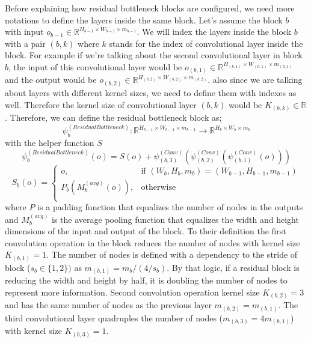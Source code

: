 Before explaining how residual bottleneck blocks are configured, we need more notations to define the layers inside the same block. Let's assume the block $b$ with input $o_{b-1} \in \mathbb{R}^{H_{b-1} \times W_{b-1} \times m_{b-1}}$. We will index the layers inside the block $b$ with a pair $(b, k)$ where $k$ stands for the index of convolutional layer inside the block. For example if we're talking about the second convolutional layer in block $b$, the input of this convolutional layer would be $o_{(b, 1)} \in \mathbb{R}^{H_{(b, 1)} \times W_{(b, 1)} \times m_{(b, 1)}}$ and the output would be $o_{(b, 2)} \in \mathbb{R}^{H_{(b, 2)} \times W_{(b, 2)} \times m_{(b, 2)}}$. also since we are talking about layers with different kernel sizes, we need to define them with indexes as well. Therefore the kernel size of convolutional layer $(b,k)$ would be $K_{(b,k)} \in \mathbb{R}$.
Therefore, we can define the residual bottleneck block as;
$$ \psi_b^{(ResidualBottleneck)}: \mathbb{R}^{H_{b-1} \times W_{b-1} \times m_{b-1}} \rightarrow  \mathbb{R}^{H_{b} \times W_{b} \times m_{b}} $$
with the helper function $S$
$$ \psi_b^{(ResidualBottleneck)}(o) =  S(o) + \psi_{(b, 3)}^{(Conv)}(\psi_{(b, 2)}^{(Conv)}(\psi_{(b, 1)}^{(Conv)}(o))) $$
\begin{equation*}
\label{eq:output_of_layers}
    S_b(o) = 
\begin{cases}
    o, &\text{if } (W_b, H_b, m_b) = (W_{b-1}, H_{b-1}, m_{b-1})\\
    P_b(M_b^{(avg)}(o)),& \text{otherwise}\\
\end{cases}
\end{equation*}
where $P$ is a padding function that equalizes the number of nodes in the outputs and $M_b^{(avg)}$ is the average pooling function that equalizes the width and height dimensions of the input and output of the block.
To their definition the first convolution operation in the block reduces the number of nodes with kernel size $K_{(b,1)}=1$. The number of nodes is defined with a dependency to the stride of block ($s_b \in \{1,2\})$ as $m_{(b,1)} = m_{b}/(4/s_b)$. By that logic, if a residual block is reducing the width and height by half, it is doubling the number of nodes to represent more information. Second convolution operation kernel size $K_{(b,2)}=3$ and has the same number of nodes as the previous layer $m_{(b,2)} = m_{(b,1)}$. The third convolutional layer quadruples the number of nodes ($m_{(b,3)} = 4m_{(b,1)}$) with kernel size $K_{(b,3)} = 1$.

